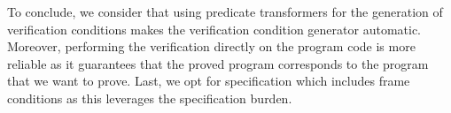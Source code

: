 To conclude, we 
 consider that  using predicate transformers for the generation of verification conditions makes the verification condition generator automatic. Moreover, 
     performing the verification directly on the program code is more reliable as it guarantees that the proved program corresponds to the program that we want to prove.
Last, we opt for specification which includes frame conditions as this leverages the specification burden.  
